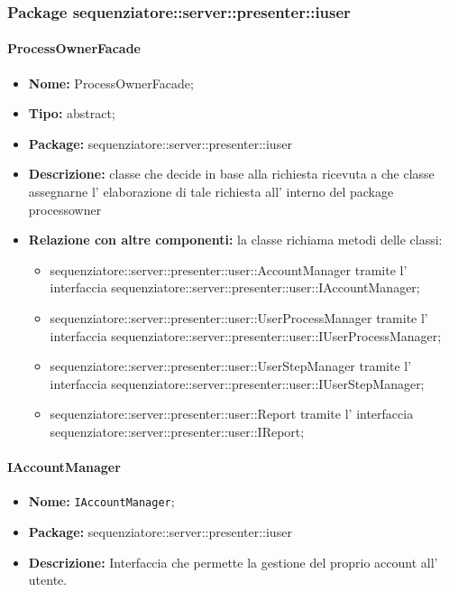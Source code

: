 \subsubsection{Package sequenziatore::server::presenter::iuser}
\paragraph{ProcessOwnerFacade}
	\begin{itemize}
		\item \textbf{Nome:} ProcessOwnerFacade;
		\item \textbf{Tipo:} abstract;
		\item \textbf{Package:} sequenziatore::server::presenter::iuser
		\item \textbf{Descrizione:} classe che decide in base alla richiesta ricevuta a che classe assegnarne l' elaborazione di tale richiesta all' interno del package processowner
		\item \textbf{Relazione con altre componenti:} la classe richiama metodi delle classi:
		\begin{itemize}
			\item sequenziatore::server::presenter::user::AccountManager tramite l' interfaccia			sequenziatore::server::presenter::user::IAccountManager;
			\item sequenziatore::server::presenter::user::UserProcessManager tramite l' interfaccia sequenziatore::server::presenter::user::IUserProcessManager;
			\item sequenziatore::server::presenter::user::UserStepManager tramite l' interfaccia sequenziatore::server::presenter::user::IUserStepManager;
			\item sequenziatore::server::presenter::user::Report tramite l' interfaccia sequenziatore::server::presenter::user::IReport;
		\end{itemize}
	\end{itemize}
\paragraph{IAccountManager}
	\begin{itemize}
		\item \textbf{Nome:} \texttt{IAccountManager};
		\item \textbf{Package:} sequenziatore::server::presenter::iuser
		\item \textbf{Descrizione:} Interfaccia che permette la gestione del proprio account all' utente.
	\end{itemize}
